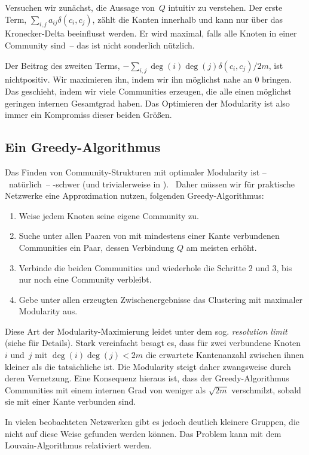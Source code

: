 Versuchen wir zunächst, die Aussage von~$Q$ intuitiv zu verstehen.
Der erste Term, \dh $\sum_{i,j} a_{ij} \delta(c_i, c_j)$, zählt die Kanten innerhalb und kann nur über das Kronecker-Delta beeinflusst werden.
Er wird maximal, falls alle Knoten in einer Community sind~-- das ist nicht sonderlich nützlich.

Der Beitrag des zweiten Terms, \dh $-\sum_{i,j} \deg(i)\deg(j) \delta(c_i, c_j)/2m$, ist nichtpositiv.
Wir maximieren ihn, indem wir ihn möglichst nahe an $0$ bringen.
Das geschieht, indem wir viele Communities erzeugen, die alle einen möglichst geringen internen Gesamtgrad haben.
Das Optimieren der Modularity ist also immer ein Kompromiss dieser beiden Größen.

\subsection{Ein Greedy-Algorithmus}
Das Finden von Community-Strukturen mit optimaler Modularity ist --~natürlich~-- \NP-schwer (und trivialerweise in \NP).~\cite{DBLP:journals/tkde/BrandesDGGHNW08}
Daher müssen wir für praktische Netzwerke eine Approximation nutzen, \zB folgenden Greedy-Algorithmus:

\begin{enumerate}
    \item Weise jedem Knoten seine eigene Community zu.
    \item Suche unter allen Paaren von mit mindestens einer Kante verbundenen Communities ein Paar, dessen Verbindung $Q$ am meisten erhöht.
    \item Verbinde die beiden Communities und wiederhole die Schritte 2 und 3, bis nur noch eine Community verbleibt.
    \item Gebe unter allen erzeugten Zwischenergebnisse das Clustering mit maximaler Modularity aus.
\end{enumerate}

Diese Art der Modularity-Maximierung leidet unter dem sog. \emph{resolution limit} (siehe \cite{barabasi2014network} für Details).
Stark vereinfacht besagt es, dass für zwei verbundene Knoten $i$ und~$j$ mit $\deg(i) \deg(j) < 2m$ die erwartete Kantenanzahl zwischen ihnen kleiner als die tatsächliche ist.
Die Modularity steigt daher zwangsweise durch deren Vernetzung.
Eine Konsequenz hieraus ist, dass der Greedy-Algorithmus Communities mit einem internen Grad von weniger als $\sqrt{2m}$ verschmilzt, sobald sie mit einer Kante verbunden sind.

In vielen beobachteten Netzwerken gibt es jedoch deutlich kleinere Gruppen, die nicht auf diese Weise gefunden werden können.
Das Problem kann \zB mit dem Louvain-Algorithmus relativiert werden.
